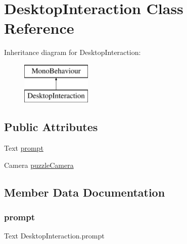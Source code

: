 \hypertarget{class_desktop_interaction}{}\section{Desktop\+Interaction Class Reference}
\label{class_desktop_interaction}
Inheritance diagram for Desktop\+Interaction\+:\begin{figure}[H]
\begin{center}
\leavevmode
\includegraphics[height=2.000000cm]{class_desktop_interaction}
\end{center}
\end{figure}
\subsection*{Public Attributes}
\begin{DoxyCompactItemize}
\item 
Text \hyperlink{class_desktop_interaction_aaaa52b3abff9c12d9608954274d59741}{prompt}
\item 
Camera \hyperlink{class_desktop_interaction_acf4984e2694edc76dd5fa0ca18559d76}{puzzle\+Camera}
\end{DoxyCompactItemize}


\subsection{Member Data Documentation}
\mbox{\label{class_desktop_interaction_aaaa52b3abff9c12d9608954274d59741}} 
\subsubsection{\texorpdfstring{prompt}{prompt}}
{\footnotesize\ttfamily Text Desktop\+Interaction.\+prompt}

\mbox{\label{class_desktop_interaction_acf4984e2694edc76dd5fa0ca18559d76}} 

